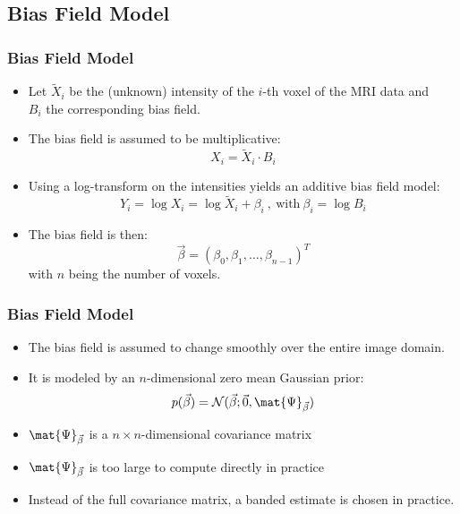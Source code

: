 \subsection{Bias Field Model}

\begin{frame}
  \frametitle{Bias Field Model}

  \begin{itemize}
    \item Let $\tilde{X}_i$ be the (unknown) intensity of the $i$-th voxel of the MRI data and \\
      $B_i$ the corresponding bias field. \pause
    \item The bias field is assumed to be multiplicative:
      \begin{displaymath}
        X_i = \tilde{X}_i \cdot B_i
      \end{displaymath}
      \pause
    \item Using a log-transform on the intensities yields an additive bias field model:
      \begin{displaymath}
        Y_i = \log X_i = \log \tilde{X}_i + \beta_i ~,~\mbox{with}~ \beta_i = \log B_i
      \end{displaymath}
      \pause
    \item The bias field is then:
      \begin{displaymath}
        \vec \beta = \left(\beta_0, \beta_1, \ldots, \beta_{n-1}\right)^T
      \end{displaymath}
      with $n$ being the number of voxels.
  \end{itemize}
\end{frame}


\begin{frame}
  \frametitle{Bias Field Model \cont}

  \begin{itemize}
    \item The bias field is assumed to change smoothly over the entire image domain.
    \item It is modeled by an $n$-dimensional zero mean Gaussian prior:
      \begin{displaymath}
        p(\vec \beta) = {\mathcal N}(\vec{\beta} ; \vec{0}, \mat{\Psi}_{\vec{\beta}})
      \end{displaymath}
  \end{itemize}
  \pspread 
  

  \begin{itemize}
    \item $\mat{\Psi}_{\vec{\beta}}$ is a $n \times n$-dimensional covariance matrix \pause
    \item $\mat{\Psi}_{\vec{\beta}}$ is too large to compute directly in practice \pause
    \item Instead of the full covariance matrix, a banded estimate is chosen in practice.
  \end{itemize}
\end{frame}


